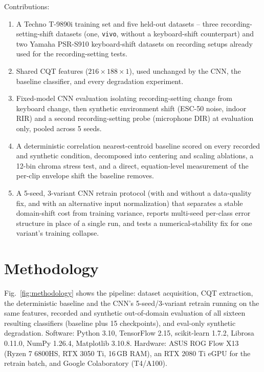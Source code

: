 \documentclass[pdflatex,sn-mathphys-num,iicol]{sn-jnl}
\theoremstyle{thmstyleone}
\theoremstyle{thmstyletwo}
\theoremstyle{thmstylethree}
\begin{document}
Contributions:
\begin{enumerate}[1.]
\item A Techno T-9890i training set and five held-out datasets -- three recording-setting-shift datasets (one, \texttt{vivo}, without a keyboard-shift counterpart) and two Yamaha PSR-S910 keyboard-shift datasets on recording setups already used for the recording-setting tests.
\item Shared CQT features ($216\times188\times1$), used unchanged by the CNN, the baseline classifier, and every degradation experiment.
\item Fixed-model CNN evaluation isolating recording-setting change from keyboard change, then synthetic environment shift (ESC-50 noise, indoor RIR) and a second recording-setting probe (microphone DIR) at evaluation only, pooled across 5 seeds.
\item A deterministic correlation nearest-centroid baseline scored on every recorded and synthetic condition, decomposed into centering and scaling ablations, a 12-bin chroma stress test, and a direct, equation-level measurement of the per-clip envelope shift the baseline removes.
\item A 5-seed, 3-variant CNN retrain protocol (with and without a data-quality fix, and with an alternative input normalization) that separates a stable domain-shift cost from training variance, reports multi-seed per-class error structure in place of a single run, and tests a numerical-stability fix for one variant's training collapse.
\end{enumerate}

\section{Methodology}\label{sec3}

Fig.~\ref{fig:methodology} shows the pipeline: dataset acquisition, CQT extraction, the deterministic baseline and the CNN's 5-seed/3-variant retrain running on the same features, recorded and synthetic out-of-domain evaluation of all sixteen resulting classifiers (baseline plus 15 checkpoints), and eval-only synthetic degradation. Software: Python 3.10, TensorFlow 2.15, scikit-learn 1.7.2, Librosa 0.11.0, NumPy 1.26.4, Matplotlib 3.10.8. Hardware: ASUS ROG Flow X13 (Ryzen 7 6800HS, RTX 3050 Ti, 16\,GB RAM), an RTX 2080 Ti eGPU for the retrain batch, and Google Colaboratory (T4/A100).
\end{document}
